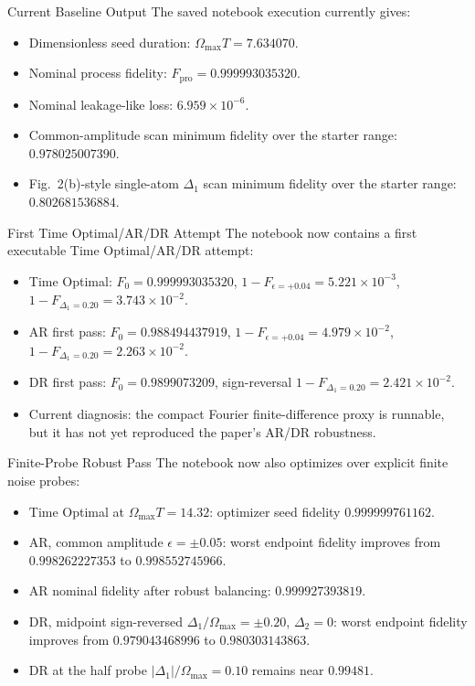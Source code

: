 \documentclass[aspectratio=169]{beamer}
\begin{document}
\begin{frame}{Current Baseline Output}
  The saved notebook execution currently gives:
  \begin{itemize}
    \item Dimensionless seed duration: \(\Omega_{\max}T = 7.634070\).
    \item Nominal process fidelity: \(F_{\mathrm{pro}} = 0.999993035320\).
    \item Nominal leakage-like loss: \(6.959\times 10^{-6}\).
    \item Common-amplitude scan minimum fidelity over the starter range: \(0.978025007390\).
    \item Fig.~2(b)-style single-atom \(\Delta_1\) scan minimum fidelity over the starter range: \(0.802681536884\).
  \end{itemize}
\end{frame}

\begin{frame}{First Time Optimal/AR/DR Attempt}
  The notebook now contains a first executable Time Optimal/AR/DR attempt:
  \begin{itemize}
    \item Time Optimal: \(F_0=0.999993035320\), \(1-F_{\epsilon=+0.04}=5.221\times10^{-3}\), \(1-F_{\Delta_1=0.20}=3.743\times10^{-2}\).
    \item AR first pass: \(F_0=0.988494437919\), \(1-F_{\epsilon=+0.04}=4.979\times10^{-2}\), \(1-F_{\Delta_1=0.20}=2.263\times10^{-2}\).
    \item DR first pass: \(F_0=0.9899073209\), sign-reversal \(1-F_{\Delta_1=0.20}=2.421\times10^{-2}\).
    \item Current diagnosis: the compact Fourier finite-difference proxy is runnable, but it has not yet reproduced the paper's AR/DR robustness.
  \end{itemize}
\end{frame}

\begin{frame}{Finite-Probe Robust Pass}
  The notebook now also optimizes over explicit finite noise probes:
  \begin{itemize}
    \item Time Optimal at \(\Omega_{\max}T=14.32\): optimizer seed fidelity \(0.999999761162\).
    \item AR, common amplitude \(\epsilon=\pm0.05\): worst endpoint fidelity improves from \(0.998262227353\) to \(0.998552745966\).
    \item AR nominal fidelity after robust balancing: \(0.999927393819\).
    \item DR, midpoint sign-reversed \(\Delta_1/\Omega_{\max}=\pm0.20\), \(\Delta_2=0\): worst endpoint fidelity improves from \(0.979043468996\) to \(0.980303143863\).
    \item DR at the half probe \(|\Delta_1|/\Omega_{\max}=0.10\) remains near \(0.99481\).
  \end{itemize}
\end{frame}
\end{document}
